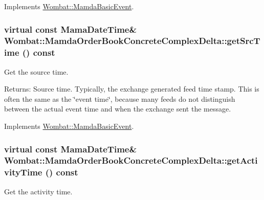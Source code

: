 Implements \hyperlink{classWombat_1_1MamdaBasicEvent_7285491c2c657207a64b1b0449c0339b}{Wombat::Mamda\-Basic\-Event}.\hypertarget{classWombat_1_1MamdaOrderBookConcreteComplexDelta_a35d38983bbb09784e4d7fd7be18ece4}{
\subsubsection[getSrcTime]{\setlength{\rightskip}{0pt plus 5cm}virtual const Mama\-Date\-Time\& Wombat::Mamda\-Order\-Book\-Concrete\-Complex\-Delta::get\-Src\-Time () const}}
\label{classWombat_1_1MamdaOrderBookConcreteComplexDelta_a35d38983bbb09784e4d7fd7be18ece4}


Get the source time. 

\begin{Desc}
\item[Returns:]Source time. Typically, the exchange generated feed time stamp. This is often the same as the \char`\"{}event time\char`\"{}, because many feeds do not distinguish between the actual event time and when the exchange sent the message. \end{Desc}


Implements \hyperlink{classWombat_1_1MamdaBasicEvent_60b5d51f3799c4762090505ef5b213e9}{Wombat::Mamda\-Basic\-Event}.\hypertarget{classWombat_1_1MamdaOrderBookConcreteComplexDelta_92fbba5b38824d35c83df4f7c4d3c988}{
\subsubsection[getActivityTime]{\setlength{\rightskip}{0pt plus 5cm}virtual const Mama\-Date\-Time\& Wombat::Mamda\-Order\-Book\-Concrete\-Complex\-Delta::get\-Activity\-Time () const}}
\label{classWombat_1_1MamdaOrderBookConcreteComplexDelta_92fbba5b38824d35c83df4f7c4d3c988}


Get the activity time. 

